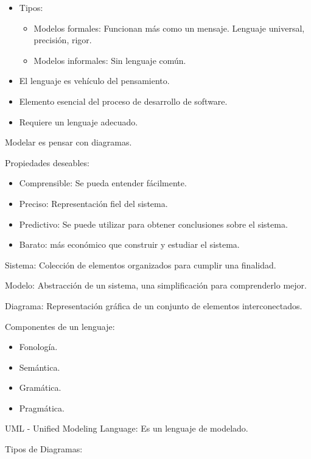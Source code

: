 \documentclass[12pt, twoside, openright]{report} %
\begin{document}
\begin{itemize}
	\item Tipos:

	      \begin{itemize}
		      \item Modelos formales: Funcionan más como un mensaje. Lenguaje
		            universal, precisión, rigor.
		      \item Modelos informales: Sin lenguaje común.
	      \end{itemize}
	\item El lenguaje es vehículo del pensamiento.
	\item Elemento esencial del proceso de desarrollo de software.
	\item Requiere un lenguaje adecuado.
\end{itemize}

Modelar es pensar con diagramas.

Propiedades deseables:

\begin{itemize}
	\item Comprensible: Se pueda entender fácilmente.
	\item Preciso: Representación fiel del sistema.
	\item Predictivo: Se puede utilizar para obtener conclusiones sobre el
	      sistema.
	\item Barato: más económico que construir y estudiar el sistema.
\end{itemize}

Sistema: Colección de elementos organizados para cumplir una
finalidad.

Modelo: Abstracción de un sistema, una simplificación para
comprenderlo mejor.

Diagrama: Representación gráfica de un conjunto de elementos
interconectados.

Componentes de un lenguaje:

\begin{itemize}
	\item Fonología.
	\item Semántica.
	\item Gramática.
	\item Pragmática.
\end{itemize}

UML - Unified Modeling Language: Es un lenguaje de modelado.

Tipos de Diagramas:
\end{document}
